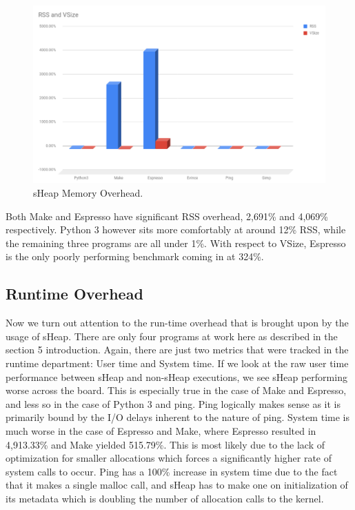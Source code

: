 \documentclass[conference]{IEEEtran}
\begin{document}
\begin{figure}[htbp]
  \centering
  \includegraphics[width=\linewidth]{sheap-mem-overhead-graph.png}
  \caption{sHeap Memory Overhead.}
  \label{fig:sheap-mem-overhead-graph}
\end{figure}

Both Make and Espresso have significant RSS overhead, 2,691\% and 4,069\% respectively. Python 3 
however sits more comfortably at around 12\% RSS, while the remaining three programs are all 
under 1\%. With respect to VSize, Espresso is the only poorly performing benchmark coming in at 324\%.

\subsection{Runtime Overhead}
Now we turn out attention to the run-time overhead that is brought upon by the usage of sHeap. 
There are only four programs at work here as described in the section 5 introduction. Again, 
there are just two metrics that were tracked in the runtime department: User time and System 
time. If we look at the raw user time performance between sHeap and non-sHeap executions, we 
see sHeap performing worse across the board. This is especially true in the case of Make and 
Espresso, and less so in the case of Python 3 and ping. Ping logically makes sense as it is 
primarily bound by the I/O delays inherent to the nature of ping. System time is much worse 
in the case of Espresso and Make, where Espresso resulted in 4,913.33\% and Make yielded 
515.79\%. This is most likely  due to the lack of optimization for smaller allocations which 
forces a significantly higher rate of system calls to occur. Ping has a 100\% increase in system time due to the fact that 
it makes a single malloc call, and sHeap has to make one on initialization of its metadata which is doubling 
the number of allocation calls to the kernel. 
\end{document}
